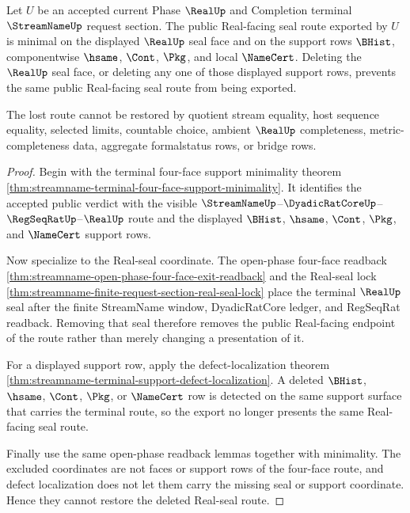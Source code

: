 \begin{theorem}
\label{thm:streamname-terminal-support-real-seal-minimality}
Let $U$ be an accepted current Phase $\RealUp$ and Completion terminal
$\StreamNameUp$ request section. The public Real-facing seal route exported by
$U$ is minimal on the displayed $\RealUp$ seal face and on the support rows
$\BHist$, componentwise $\hsame$, $\Cont$, $\Pkg$, and local $\NameCert$.
Deleting the $\RealUp$ seal face, or deleting any one of those displayed
support rows, prevents the same public Real-facing seal route from being
exported.

The lost route cannot be restored by quotient stream equality, host sequence
equality, selected limits, countable choice, ambient $\RealUp$ completeness,
metric-completeness data, aggregate formalstatus rows, or bridge rows.
\end{theorem}
\begin{proof}
Begin with the terminal four-face support minimality theorem
\autoref{thm:streamname-terminal-four-face-support-minimality}. It identifies
the accepted public verdict with the visible
$\StreamNameUp$--$\DyadicRatCoreUp$--$\RegSeqRatUp$--$\RealUp$ route and the
displayed $\BHist$, $\hsame$, $\Cont$, $\Pkg$, and $\NameCert$ support rows.

Now specialize to the Real-seal coordinate. The open-phase four-face readback
\autoref{thm:streamname-open-phase-four-face-exit-readback} and the Real-seal
lock \autoref{thm:streamname-finite-request-section-real-seal-lock} place the
terminal $\RealUp$ seal after the finite StreamName window, DyadicRatCore
ledger, and RegSeqRat readback. Removing that seal therefore removes the
public Real-facing endpoint of the route rather than merely changing a
presentation of it.

For a displayed support row, apply the defect-localization theorem
\autoref{thm:streamname-terminal-support-defect-localization}. A deleted
$\BHist$, $\hsame$, $\Cont$, $\Pkg$, or $\NameCert$ row is detected on the
same support surface that carries the terminal route, so the export no longer
presents the same Real-facing seal route.

Finally use the same open-phase readback lemmas together with minimality. The
excluded coordinates are not faces or support rows of the four-face route, and
defect localization does not let them carry the missing seal or support
coordinate. Hence they cannot restore the deleted Real-seal route.
\end{proof}

